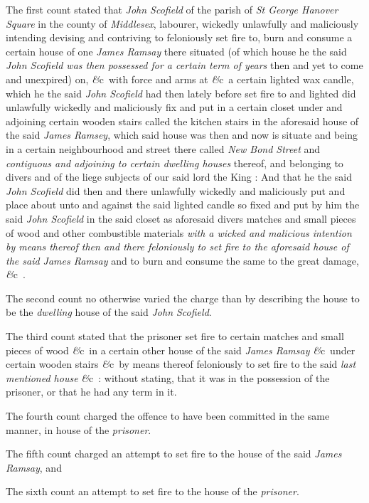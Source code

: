 \documentclass[a4paper]{article}
\newcommand{\etc}{\emph{\&}c\ }
\begin{document}
The first count stated that \emph{John Scofield} of the parish of \emph{St George Hanover Square} in the county of \emph{Middlesex}, labourer, wickedly unlawfully and maliciously intending devising and contriving to  feloniously set fire to, burn and consume a certain house of one \emph{James Ramsay} there situated (of which house he the said \emph{John Scofield was then possessed for a certain term of years} then and yet to come and unexpired) on, \etc with force and arms at \etc a certain lighted wax candle, which he the said \emph{John Scofield} had then lately before set fire to and lighted did unlawfully wickedly and maliciously fix and put in a certain closet under and adjoining certain wooden stairs called the kitchen stairs in the aforesaid house of the said \emph{James Ramsey}, which said house was then and now is situate and being in a certain neighbourhood and street there called \emph{New Bond Street} and \emph{contiguous and adjoining to certain dwelling houses} thereof, and belonging to divers and of the liege subjects of our said lord the King : And that he the said \emph{John Scofield} did then and there unlawfully wickedly and maliciously put and place about unto and against the said lighted candle so fixed and put by him the said \emph{John Scofield} in the said closet as aforesaid divers matches and small pieces of wood and other combustible materials \emph{with a wicked and malicious intention by means thereof then and there feloniously to set fire to the aforesaid house of the said James Ramsay} and to burn and consume the same to the great damage, \etc.

The second count no otherwise varied the charge than by describing the house to be the \emph{dwelling} house of the said \emph{John Scofield}.

The third count stated that the prisoner set fire to certain matches and small pieces of wood \etc in a certain other house of the said \emph{James Ramsay} \etc under certain wooden stairs \etc by means thereof feloniously to set fire to the said \emph{last mentioned house} \etc : without stating, that it was in the possession of the prisoner, or that he had any term in it.

The fourth count charged the offence to have been committed in the same manner, in house of the \emph{prisoner}.

The fifth count charged an attempt to set fire to the house of the said \emph{James Ramsay}, and

The sixth count an attempt to set fire to the house of the \emph{prisoner}.
\end{document}
